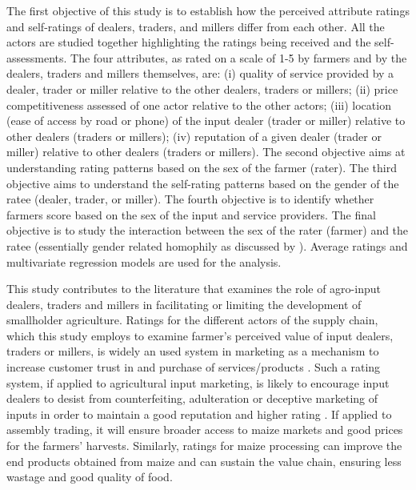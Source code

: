 \documentclass[12pt,english]{article}\usepackage[]{graphicx}\usepackage[]{color}
\begin{document}
\begin{onehalfspace}
The first objective of this study is to establish how the perceived
attribute ratings and self-ratings of dealers, traders, and millers
differ from each other. All the actors are studied together highlighting
the ratings being received and the self-assessments. The four attributes,
as rated on a scale of 1-5 by farmers and by the dealers, traders
and millers themselves, are: (i) quality of service provided by a
dealer, trader or miller relative to the other dealers, traders or
millers; (ii) price competitiveness assessed of one actor relative
to the other actors; (iii) location (ease of access by road or phone)
of the input dealer (trader or miller) relative to other dealers (traders
or millers); (iv) reputation of a given dealer (trader or miller)
relative to other dealers (traders or millers). The second objective
aims at understanding rating patterns based on the sex of the farmer
(rater). The third objective aims to understand the self-rating patterns
based on the gender of the ratee (dealer, trader, or miller). The
fourth objective is to identify whether farmers score based on the
sex of the input and service providers. The final objective is to
study the interaction between the sex of the rater (farmer) and the
ratee (essentially gender related homophily as discussed by \citet{mcpherson2001birds}).
Average ratings and multivariate regression models are used for the
analysis.

This study contributes to the literature that examines the role of
agro-input dealers, traders and millers in facilitating or limiting
the development of smallholder agriculture. Ratings for the different
actors of the supply chain, which this study employs to examine farmer's
perceived value of input dealers, traders or millers, is widely an
used system in marketing as a mechanism to increase customer trust
in and purchase of services/products \citep{Jayashankar2018,Chiu2014}.
Such a rating system, if applied to agricultural input marketing,
is likely to encourage input dealers to desist from counterfeiting,
adulteration or deceptive marketing of inputs in order to maintain
a good reputation and higher rating \citep{Kim2013,Bente2012,BarIsaac2008}.
If applied to assembly trading, it will ensure broader access to maize
markets and good prices for the farmers' harvests. Similarly, ratings
for maize processing can improve the end products obtained from maize
and can sustain the value chain, ensuring less wastage and good quality
of food.


\end{onehalfspace}
\end{document}
